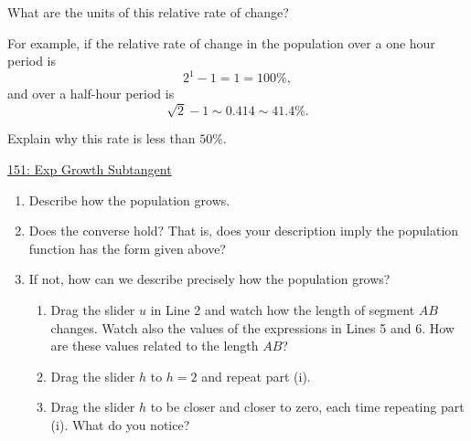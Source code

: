 \documentclass{ximera}
\begin{document}
What are the units of this relative rate of change?
\begin{freeResponse}
\end{freeResponse}

For example, if the relative rate of change in the population over a one hour period is
\[ 
        2^1 - 1 = 1 = 100\%,
\]
and over a half-hour period is
\[
    \sqrt{2} - 1 \sim 0.414 \sim 41.4\%.
\]

Explain why this rate is less than $50\%$.
\begin{freeResponse}
\end{freeResponse}




\href{https://www.desmos.com/calculator/ri5r9suauk}{151: Exp Growth Subtangent}

 
\begin{onlineOnly}
    \begin{center}
\end{center}
\end{onlineOnly}

\begin{enumerate}
\item Describe how the population grows.

\item Does the converse hold? That is, does your description imply the population function has the form given above?

\item If not, how can we describe precisely how the population grows?

\begin{enumerate}
\item Drag the slider $u$ in Line 2 and watch how the length of segment $AB$ changes. Watch also the values of the expressions in Lines 5 and 6. How are these values related to the length $AB$?

\item Drag the slider $h$ to $h=2$ and repeat part (i).

\item Drag the slider $h$ to be closer and closer to zero, each time repeating part (i). What do you notice? 

\end{enumerate}

\end{enumerate}

\end{document}
